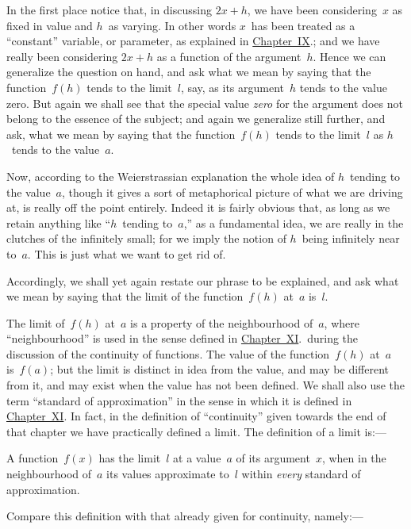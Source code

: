 \documentclass[12pt,leqno]{book}[2005/09/16]
\newcommand{\Chg}[2]{#2}
\newcommand{\ChapRef}[2][Chapter]{\hyperref[chapter:#2]{\Chg{#1}{Chapter}~#2}}
\newcommand{\PageSep}[1]{\ignorespaces}
\begin{document}
In the first place notice that, in discussing
$2x + h$, we have been considering~$x$ as fixed in
value and $h$~as varying. In other words $x$~has
been treated as a ``constant'' variable,
or parameter, as explained in \ChapRef{IX}.;
and we have really been considering $2x + h$ as
a function of the argument~$h$. Hence we can
generalize the question on hand, and ask
what we mean by saying that the function~$f(h)$
tends to the limit~$l$, say, as its argument~$h$
tends to the value zero. But again we shall
see that the special value \emph{zero} for the argument
does not belong to the essence of the subject;
and again we generalize still further, and ask,
what we mean by saying that the function~$f(h)$
tends to the limit~$l$ as $h$~tends to the value~$a$.

Now, according to the Weierstrassian explanation
the whole idea of $h$~tending to the
value~$a$, though it gives a sort of metaphorical
picture of what we are driving at, is really off
the point entirely. Indeed it is fairly obvious
\PageSep{229}
that, as long as we retain anything like ``$h$~tending
to~$a$,'' as a fundamental idea, we are
really in the clutches of the infinitely small;
for we imply the notion of $h$~being infinitely
near to~$a$. This is just what we want to get
rid of.

Accordingly, we shall yet again restate our
phrase to be explained, and ask what we
mean by saying that the limit of the function~$f(h)$
at~$a$ is~$l$.

The limit of~$f(h)$ at~$a$ is a property of the
%
neighbourhood of~$a$, where ``neighbourhood''
is used in the sense defined in \ChapRef{XI}.\
during the discussion of the continuity of
functions. The value of the function~$f(h)$ at~$a$
is~$f(a)$; but the limit is distinct in idea
from the value, and may be different from
it, and may exist when the value has not
been defined. We shall also use the term
``standard of approximation'' in the sense
in which it is defined in \ChapRef{XI}. In
fact, in the definition of ``continuity'' given
towards the end of that chapter we have
practically defined a limit. The definition of
a limit is:---

A function~$f(x)$ has the limit~$l$ at a value~$a$
of its argument~$x$, when in the neighbourhood
of~$a$ its values approximate to~$l$ within
\emph{every} standard of approximation.

Compare this definition with that already
given for continuity, namely:---
\PageSep{230}
\end{document}
